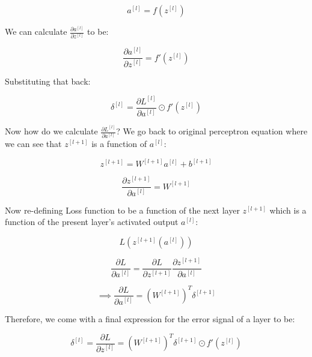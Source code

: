 \documentclass[11pt,a4paper]{article}
\begin{document}
\begin{equation}
a^{[l]} = f(z^{[l]})
\end{equation}

We can calculate $\frac{\partial{a^{[l]}}}{\partial{z^{[l]}}}$ to be:

\begin{equation}
\frac{\partial{a^{[l]}}}{\partial{z^{[l]}}} = {f'(z^{[l]})}
\end{equation}

Substituting that back:

\begin{equation}
\delta^{[l]} = \frac{\partial{L^{[l]}}}{\partial{a^{[l]}}} \odot {f'(z^{[l]})}
\end{equation}

Now how do we calculate $\frac{\partial{L^{[l]}}}{\partial{a^{[l]}}}$? We go back to original perceptron equation where we can see that $z^{[l+1]}$ is a function of $a^{[l]}$:

\begin{equation}
z^{[l+1]} = W^{[l+1]}a^{[l]} + b^{[l+1]}
\end{equation}

\begin{equation}
\frac{\partial{z^{[l+1]}}}{\partial{a^{[l]}}} = W^{[l+1]}
\end{equation}

Now re-defining Loss function to be a function of the next layer $z^{[l+1]}$ which is a function of the present layer's activated output $a^{[l]}$:

\begin{equation}
L(z^{[l+1]}(a^{[l]}))
\end{equation}

\begin{equation}
\frac{\partial{L}}{\partial{a^{[l]}}} = \frac{\partial{L}}{\partial{z^{[l+1]}}} \frac{\partial{z^{[l+1]}}}{\partial{a^{[l]}}}
\end{equation}

\begin{equation}
\implies \frac{\partial{L}}{\partial{a^{[l]}}} = (W^{[l+1]})^T \delta^{[l+1]}
\end{equation}

Therefore, we come with a final expression for the error signal of a layer to be:

\begin{mdframed}[style=eqbox]
\begin{equation}
\delta^{[l]} = \frac{\partial{L}}{\partial{z^{[l]}}} = (W^{[l+1]})^T \delta^{[l+1]} \odot {f'(z^{[l]})}
\end{equation}
\end{mdframed}
\end{document}
